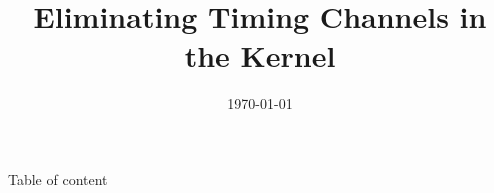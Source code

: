 \documentclass{beamer}
\title{Eliminating Timing Channels in the Kernel}
\author{}
\institute{}
\date{\today}
\begin{document}
\begin{frame}
	\titlepage
\end{frame}

\begin{frame}{Table of content}
	\tableofcontents
\end{frame}







\end{document}
